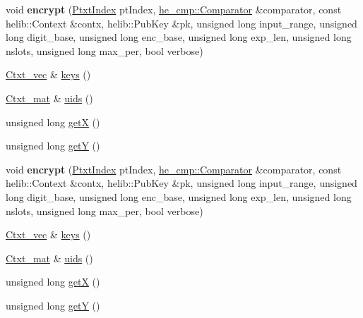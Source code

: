 \begin{DoxyCompactItemize}
\item 
\mbox{\label{classHDB__supergate___1_1CtxtIndex_a6ace7831c4e9481a6d3e4c3a7af2c680}} 
void {\bfseries encrypt} (\hyperlink{classHDB__supergate___1_1PtxtIndex}{Ptxt\+Index} pt\+Index, \hyperlink{classhe__cmp_1_1Comparator}{he\+\_\+cmp\+::\+Comparator} \&comparator, const helib\+::\+Context \&contx, helib\+::\+Pub\+Key \&pk, unsigned long input\+\_\+range, unsigned long digit\+\_\+base, unsigned long enc\+\_\+base, unsigned long exp\+\_\+len, unsigned long nslots, unsigned long max\+\_\+per, bool verbose)
\item 
\hyperlink{namespaceHDB__supergate___ade0781b5973aae08b689ed72b30511fb}{Ctxt\+\_\+vec} \& \hyperlink{classHDB__supergate___1_1CtxtIndex_aab60ebde906ebfbf292fcc301168a54a}{keys} ()
\item 
\hyperlink{namespaceHDB__supergate___a46a3fb2b98c95dc7615203376c4ad0c8}{Ctxt\+\_\+mat} \& \hyperlink{classHDB__supergate___1_1CtxtIndex_a928f500292b531aac98d86fb4e3511ec}{uids} ()
\item 
unsigned long \hyperlink{classHDB__supergate___1_1CtxtIndex_ad3ee6eaf8a48319e153f30a6914dc6a9}{getX} ()
\item 
unsigned long \hyperlink{classHDB__supergate___1_1CtxtIndex_a1982acce75987d7a292341d5af81f1fd}{getY} ()
\item 
\mbox{\label{classHDB__supergate___1_1CtxtIndex_a6ace7831c4e9481a6d3e4c3a7af2c680}} 
void {\bfseries encrypt} (\hyperlink{classHDB__supergate___1_1PtxtIndex}{Ptxt\+Index} pt\+Index, \hyperlink{classhe__cmp_1_1Comparator}{he\+\_\+cmp\+::\+Comparator} \&comparator, const helib\+::\+Context \&contx, helib\+::\+Pub\+Key \&pk, unsigned long input\+\_\+range, unsigned long digit\+\_\+base, unsigned long enc\+\_\+base, unsigned long exp\+\_\+len, unsigned long nslots, unsigned long max\+\_\+per, bool verbose)
\item 
\hyperlink{namespaceHDB__supergate___ade0781b5973aae08b689ed72b30511fb}{Ctxt\+\_\+vec} \& \hyperlink{classHDB__supergate___1_1CtxtIndex_aab60ebde906ebfbf292fcc301168a54a}{keys} ()
\item 
\hyperlink{namespaceHDB__supergate___a46a3fb2b98c95dc7615203376c4ad0c8}{Ctxt\+\_\+mat} \& \hyperlink{classHDB__supergate___1_1CtxtIndex_a928f500292b531aac98d86fb4e3511ec}{uids} ()
\item 
unsigned long \hyperlink{classHDB__supergate___1_1CtxtIndex_ad3ee6eaf8a48319e153f30a6914dc6a9}{getX} ()
\item 
unsigned long \hyperlink{classHDB__supergate___1_1CtxtIndex_a1982acce75987d7a292341d5af81f1fd}{getY} ()
\end{DoxyCompactItemize}


